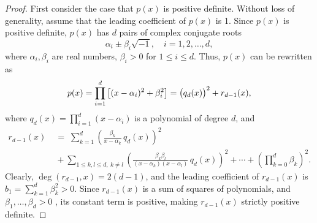 \documentclass[runningheads]{llncs}
\begin{document}
\begin{proof} First consider the case that $p(x)$ is positive definite. 
Without loss of generality, assume that the leading coefficient of $p(x)$ is 1. Since $p(x)$ is positive definite, $p(x)$ has $d$ pairs of complex conjugate roots  
\[
\alpha_i\pm\beta_i\sqrt{-1}, \quad i=1,2,\ldots,d,
\]
where $\alpha_i, \beta_i$ are real numbers, $\beta_i > 0$ for $1\leq i\leq d$.  
Thus, $p(x)$ can be rewritten as  
\begin{equation}
  p(x)=\prod_{i=1}^{d} \left[(x-\alpha_i)^2+\beta_i^2\right]=
\left(q_d(x)\vphantom{x_1^2}\right)^2+r_{d-1}(x),
\label{eq-0002}
\end{equation}
where $q_d(x)=\prod_{i=1}^{d}(x-\alpha_i)$ is a polynomial of degree $d$, and  
\begin{align}
r_{d-1}(x)&\;=\;
\sum_{k=1}^{d}\left(\frac{\beta_k}{x-\alpha_k}\,q_d(x)\right)^2\nonumber \\
&\;+\sum_{1\le k,l\le {d}, \ k\neq l}\left(\frac{\beta_k \beta_l}{(x-\alpha_k)(x-\alpha_l)}\,q_d(x)\right)^2
+\cdots+ \left(\prod_{k=0}^{d}\beta_k\right)^2.
\nonumber
\end{align}
Clearly, $\deg(r_{d-1},x)\!=\!2(d-1)$, and the leading coefficient of $r_{d-1}(x)$ is 
$b_1 = \sum_{k=1}^d \beta_k^2 >0$. 
Since $r_{d-1}(x)$ is a sum of squares of polynomials, 
and $\beta_1,\ldots,\beta_d > 0$ ,  its constant term is positive, making $r_{d-1}(x)$ strictly positive definite. 


\end{proof}
\end{document}
